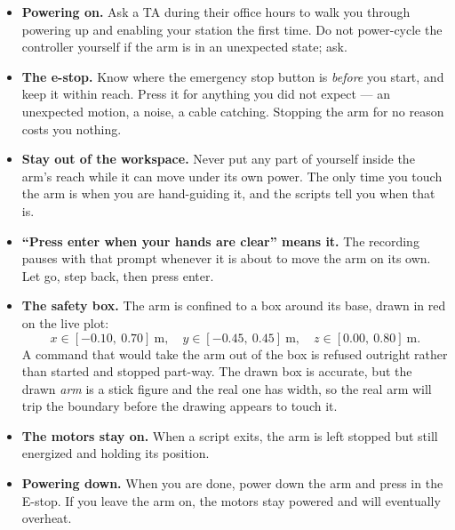 \documentclass{16384_doc}
\begin{document}
\begin{questions}
    \begin{tcolorbox}[colback=red!5, colframe=red!60!black,
        title={Safety: Read this before you touch the robot}]
    \begin{itemize}
      \item \textbf{Powering on.} Ask a TA during their office hours to walk you through powering up and
            enabling your station the first time.  Do not power-cycle the
            controller yourself if the arm is in an unexpected state; ask.
      \item \textbf{The e-stop.} Know where the emergency stop button is
            \emph{before} you start, and keep it within reach.  Press it for
            anything you did not expect --- an unexpected motion, a noise, a
            cable catching.  Stopping the arm for no reason costs you nothing.
      \item \textbf{Stay out of the workspace.} Never put any part of yourself
            inside the arm's reach while it can move under its own power.  The
            only time you touch the arm is when you are hand-guiding it, and the
            scripts tell you when that is.
      \item \textbf{``Press enter when your hands are clear'' means it.} The
            recording pauses with that prompt whenever it is about to move the
            arm on its own.  Let go, step back, then press enter.
      \item \textbf{The safety box.} The arm is confined to a box around its
            base, drawn in red on the live plot:
            \[
                x \in [-0.10,\ 0.70]\ \text{m}, \quad
                y \in [-0.45,\ 0.45]\ \text{m}, \quad
                z \in [0.00,\ 0.80]\ \text{m}.
            \]
            A command that would take the arm out of the box is refused outright
            rather than started and stopped part-way.  The drawn box is accurate,
            but the drawn \emph{arm} is a stick figure and the real one has width,
            so the real arm will trip the boundary before the drawing appears to
            touch it.
      \item \textbf{The motors stay on.} When a script exits, the arm is left
            stopped but still energized and holding its position.
        \item \textbf{Powering down.} When you are done, power down the arm and press in the E-stop. If you leave the arm on, the motors stay powered and will eventually overheat.
    \end{itemize}
    \end{tcolorbox}
    \newpage


\end{questions}
\end{document}
